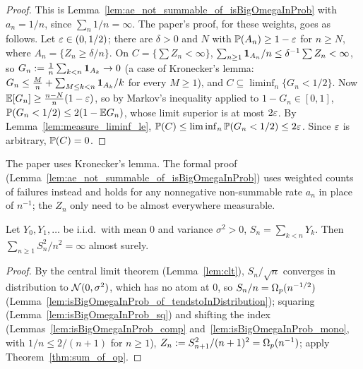 \begin{proof}
  \leanok
  This is Lemma~\ref{lem:ae_not_summable_of_isBigOmegaInProb} with $a_n = 1/n$, since
  $\sum_n 1/n = \infty$. The paper's proof, for these weights, goes as follows. Let
  $\varepsilon \in (0, 1/2)$; there are $\delta > 0$ and $N$ with $\mathbb{P}(A_n) \ge 1 - \varepsilon$ for
  $n \ge N$, where $A_n = \{Z_n \ge \delta/n\}$. On $C = \{\sum Z_n < \infty\}$,
  $\sum_{n \ge 1} \mathbf{1}_{A_n}/n \le \delta^{-1} \sum Z_n < \infty$, so
  $G_n := \frac1n \sum_{k<n} \mathbf{1}_{A_k} \to 0$ (a case of Kronecker's lemma:
  $G_n \le \frac Mn + \sum_{M \le k < n} \mathbf{1}_{A_k}/k$ for every $M \ge 1$), and
  $C \subseteq \liminf_n \{G_n < 1/2\}$. Now $\mathbb{E}[G_n] \ge \frac{n - N}{n}(1-\varepsilon)$, so by Markov's
  inequality applied to $1 - G_n \in [0,1]$, $\mathbb{P}(G_n < 1/2) \le 2(1 - \mathbb{E} G_n)$, whose limit
  superior is at most $2\varepsilon$. By Lemma~\ref{lem:measure_liminf_le},
  $\mathbb{P}(C) \le \liminf_n \mathbb{P}(G_n < 1/2) \le 2\varepsilon$. Since $\varepsilon$ is arbitrary, $\mathbb{P}(C) = 0$.
\end{proof}

\begin{remark}
  The paper uses Kronecker's lemma. The formal proof (Lemma~\ref{lem:ae_not_summable_of_isBigOmegaInProb}) uses weighted
  counts of failures instead and holds for any nonnegative non-summable rate $a_n$ in place of
  $n^{-1}$; the $Z_n$ only need to be almost everywhere measurable.
\end{remark}

\begin{corollary}[Corollary 2.3]
  \label{cor:div_sample_mean}
  \leanok
  Let $Y_0, Y_1, \dots$ be i.i.d.\ with mean $0$ and variance $\sigma^2 > 0$, $S_n = \sum_{k<n}
  Y_k$. Then $\sum_{n \ge 1} S_n^2/n^2 = \infty$ almost surely.
\end{corollary}

\begin{proof}
  \leanok
  By the central limit theorem (Lemma~\ref{lem:clt}), $S_n/\sqrt n$ converges in distribution to
  $\mathcal{N}(0, \sigma^2)$, which has no atom at $0$, so $S_n/n = \Omega_p(n^{-1/2})$
  (Lemma~\ref{lem:isBigOmegaInProb_of_tendstoInDistribution}); squaring
  (Lemma~\ref{lem:isBigOmegaInProb_sq}) and shifting the index
  (Lemmas~\ref{lem:isBigOmegaInProb_comp} and~\ref{lem:isBigOmegaInProb_mono}, with
  $1/n \le 2/(n+1)$ for $n \ge 1$), $Z_n := S_{n+1}^2/(n+1)^2 = \Omega_p(n^{-1})$; apply
  Theorem~\ref{thm:sum_of_op}.
\end{proof}

